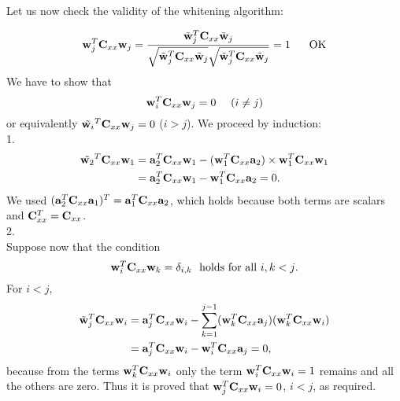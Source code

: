 \begin{enumerate}
\begin{solution}
    Let us now check the validity of the whitening algorithm:

    \[
    \mathbf{w}_j^T\mathbf{C}_{xx}\mathbf{w}_j
    =\frac{\tilde{\mathbf{w}}_j^T\mathbf{C}_{xx}\tilde{\mathbf{w}}_j}{\sqrt{\tilde{\mathbf{w}}_j^T\mathbf{C}_{xx}\tilde{\mathbf{w}}_j}\sqrt{\tilde{\mathbf{w}}_j^T\mathbf{C}_{xx}\tilde{\mathbf{w}}_j}}
    = 1 \hspace{6mm} \text{OK}
    \]
    We have to show that
    \begin{equation*}
      \mathbf{w}_i^T  \mathbf{C}_{xx} \mathbf{w}_j  = 0 \mbox{\ \ \ \ $(i \neq j)$}
    \end{equation*}
    or equivalently $\tilde{\mathbf{w}_i}^T \mathbf{C}_{xx} \mathbf{w}_j  = 0$ ($i > j$).
    We proceed by induction:
    \vspace{2mm}\\
    1.\\
    \begin{align*}
      \tilde{\mathbf{w}_2}^T \mathbf{C}_{xx} \mathbf{w}_1 &= 
      \mathbf{a}_2^T \mathbf{C}_{xx} \mathbf{w}_1 - ( \mathbf{w}_1^T \mathbf{C}_{xx} \mathbf{a}_2 ) \times 
      \mathbf{w}_1^T \mathbf{C}_{xx} \mathbf{w}_1 \nonumber \\
      &= \mathbf{a}_2^T \mathbf{C}_{xx} \mathbf{w}_1
      - \mathbf{w}_1^T \mathbf{C}_{xx} \mathbf{a}_2
      = 0 \mbox{.}
    \end{align*}
    We used $( \mathbf{a}_2^T \mathbf{C}_{xx} \mathbf{a}_1 )^T = \mathbf{a}_1^T \mathbf{C}_{xx} \mathbf{a}_2$, which holds
    because both terms are scalars and $\mathbf{C}_{xx}^T = \mathbf{C}_{xx}$.
    \vspace{2mm}\\
    2.\\
    \vspace{2mm}
    Suppose now that the condition
    \begin{equation*}
      \mathbf{w}_i^T \mathbf{C}_{xx} \mathbf{w}_k = \delta_{i,k} \mbox{\ \ holds for all $i,k < j$.}
    \end{equation*}
    For $i < j$,
    \begin{align*}
      \tilde{\mathbf{w}}_j^T \mathbf{C}_{xx} \mathbf{w}_i &= \mathbf{a}_j^T \mathbf{C}_{xx} \mathbf{w}_i - \sum_{k=1}^{j-1} 
      ( \mathbf{w}_k^T \mathbf{C}_{xx} \mathbf{a}_j ) ( \mathbf{w}_k^T \mathbf{C}_{xx} \mathbf{w}_i ) \nonumber \\
      &=  \mathbf{a}_j^T \mathbf{C}_{xx} \mathbf{w}_i - \mathbf{w}_i^T \mathbf{C}_{xx} \mathbf{a}_j = 0 \mbox{,}
    \end{align*}
    because from the terms $\mathbf{w}_k^T \mathbf{C}_{xx} \mathbf{w}_i$ only the term
    $\mathbf{w}_i^T \mathbf{C}_{xx} \mathbf{w}_i = 1$ remains and all the others are zero.
    Thus it is proved that $\mathbf{w}_j^T \mathbf{C}_{xx} \mathbf{w}_i = 0$, $i < j$, as required.


\end{solution}
\end{enumerate}

